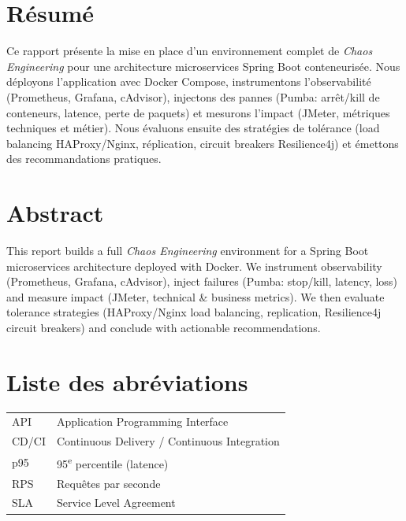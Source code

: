 \documentclass[a4paper,12pt,twoside]{report}
\begin{document}
\chapter*{Résumé}
Ce rapport présente la mise en place d'un environnement complet de \textit{Chaos Engineering}
pour une architecture microservices Spring Boot conteneurisée. Nous déployons l'application avec
Docker Compose, instrumentons l'observabilité (Prometheus, Grafana, cAdvisor), injectons des
pannes (Pumba: arrêt/kill de conteneurs, latence, perte de paquets) et mesurons l'impact
(JMeter, métriques techniques et métier). Nous évaluons ensuite des stratégies de tolérance
(load balancing HAProxy/Nginx, réplication, circuit breakers Resilience4j) et émettons des
recommandations pratiques.

\chapter*{Abstract}
This report builds a full \textit{Chaos Engineering} environment for a Spring Boot microservices
architecture deployed with Docker. We instrument observability (Prometheus, Grafana, cAdvisor),
inject failures (Pumba: stop/kill, latency, loss) and measure impact (JMeter, technical \& business
metrics). We then evaluate tolerance strategies (HAProxy/Nginx load balancing, replication,
Resilience4j circuit breakers) and conclude with actionable recommendations.

\tableofcontents
\listoffigures
\listoftables
\newpage

\chapter*{Liste des abréviations}
\begin{tabular}{@{}ll@{}}
API & Application Programming Interface\\
CD/CI & Continuous Delivery / Continuous Integration\\
p95 & 95\textsuperscript{e} percentile (latence)\\
RPS & Requêtes par seconde\\
SLA & Service Level Agreement\\
\end{tabular}
\newpage

















\end{document}
